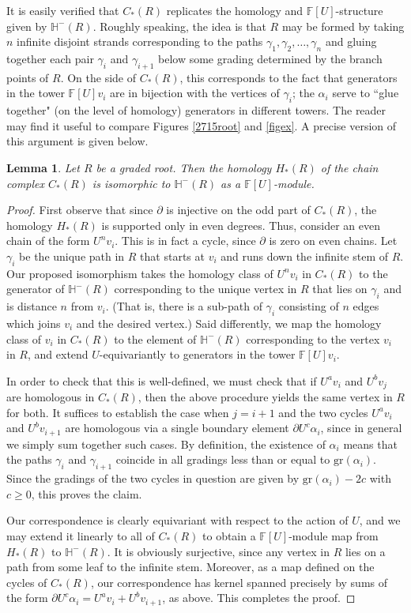 \documentclass[11 pt]{amsart}
\newtheorem {lemma}[theorem]{Lemma}
\theoremstyle{remark}
\def\gr{\mathrm{gr}}
\def\ff {{\mathbb{F}}}
\def\He{\mathbb{H}}
\begin{document}
It is easily verified that $C_*(R)$ replicates the homology and $\ff[U]$-structure given by $\He^-(R)$. Roughly speaking, the idea is that $R$ may be formed by taking $n$ infinite disjoint strands corresponding to the paths $\gamma_1, \gamma_2, \ldots, \gamma_n$ and gluing together each pair $\gamma_i$ and $\gamma_{i+1}$ below some grading determined by the branch points of $R$. On the side of $C_*(R)$, this corresponds to the fact that generators in the tower $\ff[U]v_i$ are in bijection with the vertices of $\gamma_i$; the $\alpha_i$ serve to ``glue together" (on the level of homology) generators in different towers. The reader may find it useful to compare Figures \ref{2715root} and \ref{figex}. A precise version of this argument is given below.
\begin{lemma}\label{lemgraded1}
Let $R$ be a graded root. Then the homology $H_*(R)$ of the chain complex $C_*(R)$ is isomorphic to $\He^-(R)$ as a $\ff[U]$-module.
\end{lemma}
\begin{proof}
First observe that since $\partial$ is injective on the odd part of $C_*(R)$, the homology $H_*(R)$ is supported only in even degrees. Thus, consider an even chain of the form $U^nv_i$. This is in fact a cycle, since $\partial$ is zero on even chains. Let $\gamma_i$ be the unique path in $R$ that starts at $v_i$ and runs down the infinite stem of $R$. Our proposed isomorphism takes the homology class of $U^nv_i$ in $C_*(R)$ to the generator of $\He^-(R)$ corresponding to the unique vertex in $R$ that lies on $\gamma_i$ and is distance $n$ from $v_i$. (That is, there is a sub-path of $\gamma_i$ consisting of $n$ edges which joins $v_i$ and the desired vertex.) Said differently, we map the homology class of $v_i$ in $C_*(R)$ to the element of $\He^-(R)$ corresponding to the vertex $v_i$ in $R$, and extend $U$-equivariantly to generators in the tower $\ff[U]v_i$. 

In order to check that this is well-defined, we must check that if $U^av_i$ and $U^bv_j$ are homologous in $C_*(R)$, then the above procedure yields the same vertex in $R$ for both. It suffices to establish the case when $j = i + 1$ and the two cycles $U^av_i$ and $U^bv_{i+1}$ are homologous via a single boundary element $\partial U^c\alpha_i$, since in general we simply sum together such cases. By definition, the existence of $\alpha_i$ means that the paths $\gamma_i$ and $\gamma_{i+1}$ coincide in all gradings less than or equal to $\gr(\alpha_i)$. Since the gradings of the two cycles in question are given by $\gr(\alpha_i) - 2c$ with $c \geq 0$, this proves the claim. 

Our correspondence is clearly equivariant with respect to the action of $U$, and we may extend it linearly to all of $C_*(R)$ to obtain a $\ff[U]$-module map from $H_*(R)$ to $\He^-(R)$. It is obviously surjective, since any vertex in $R$ lies on a path from some leaf to the infinite stem. Moreover, as a map defined on the cycles of $C_*(R)$, our correspondence has kernel spanned precisely by sums of the form $\partial U^c\alpha_i = U^av_i + U^bv_{i+1}$, as above. This completes the proof.
\end{proof}
\end{document}
